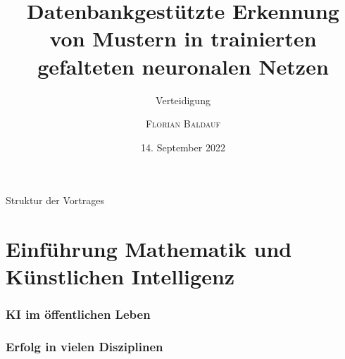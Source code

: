 \documentclass[10pt]{beamer} %
\title[Datenbankgestützte Erkennung von Mustern in trainierten gefalteten neuronalen Netzen]{Datenbankgestützte Erkennung von Mustern in trainierten gefalteten neuronalen Netzen}
\subtitle{Verteidigung}
\author{\textsc{Florian Baldauf}}
\date{14. September 2022}
\institute{Universität Rostock, Institut für Mathematik}
\begin{document}
\begin{frame}%
  \titlepage
\end{frame}


\begin{frame}{Struktur der Vortrages}%
  \tableofcontents[pausesections]
\end{frame}


\section{Einführung Mathematik und Künstlichen Intelligenz}

\begin{frame}
   \frametitle{KI im öffentlichen Leben} %





\end{frame}

\begin{frame}
   \frametitle[]{Erfolg in vielen Disziplinen}
\end{frame}
\end{document}
